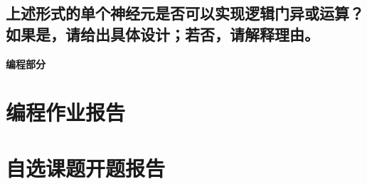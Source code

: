 \documentclass[a4paper]{article}
\begin{document}
\subsection{上述形式的单个神经元是否可以实现逻辑门异或运算？如果是，请给出具体设计；若否，请解释理由。}

\vspace{6mm}
\centerline{\textbf{\Large{编程部分}}}
\vspace{3mm}
\section{编程作业报告}
\section{自选课题开题报告}
\end{document}
